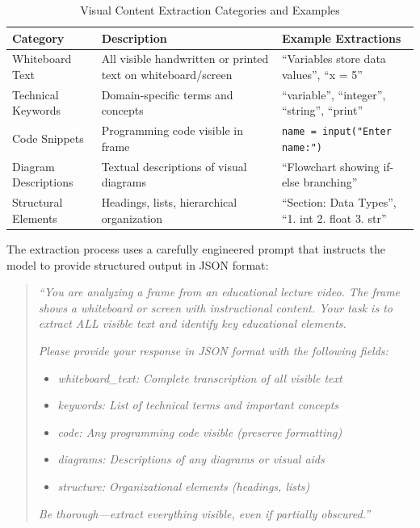 \begin{table}[h]
\centering
\caption{Visual Content Extraction Categories and Examples}
\label{tab:visual_extraction}
\begin{tabular}{|l|p{5cm}|p{5.5cm}|}
\hline
\textbf{Category} & \textbf{Description} & \textbf{Example Extractions} \\
\hline
Whiteboard Text & All visible handwritten or printed text on whiteboard/screen & ``Variables store data values'', ``x = 5'' \\
\hline
Technical Keywords & Domain-specific terms and concepts & ``variable'', ``integer'', ``string'', ``print'' \\
\hline
Code Snippets & Programming code visible in frame & \texttt{name = input("Enter name:")} \\
\hline
Diagram Descriptions & Textual descriptions of visual diagrams & ``Flowchart showing if-else branching'' \\
\hline
Structural Elements & Headings, lists, hierarchical organization & ``Section: Data Types'', ``1. int 2. float 3. str'' \\
\hline
\end{tabular}
\end{table}

The extraction process uses a carefully engineered prompt that instructs the model to provide structured output in JSON format:

\begin{quote}
\textit{``You are analyzing a frame from an educational lecture video. The frame shows a whiteboard or screen with instructional content. Your task is to extract ALL visible text and identify key educational elements.}

\textit{Please provide your response in JSON format with the following fields:}
\begin{itemize}
    \item \textit{whiteboard\_text: Complete transcription of all visible text}
    \item \textit{keywords: List of technical terms and important concepts}
    \item \textit{code: Any programming code visible (preserve formatting)}
    \item \textit{diagrams: Descriptions of any diagrams or visual aids}
    \item \textit{structure: Organizational elements (headings, lists)}
\end{itemize}
\textit{Be thorough---extract everything visible, even if partially obscured.''}
\end{quote}

